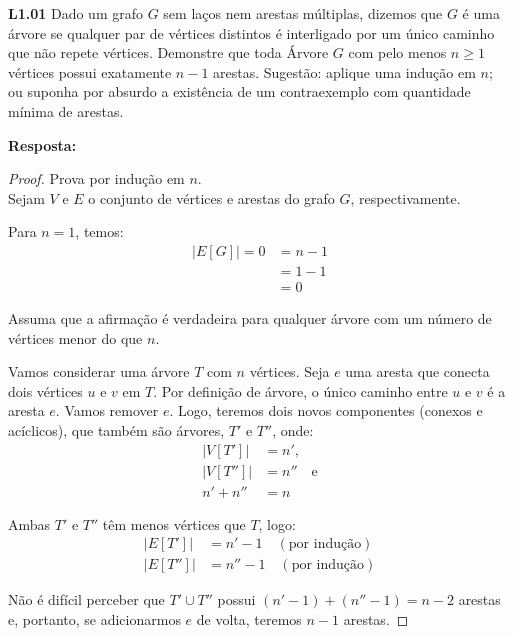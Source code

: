 
\noindent \textbf{L1.01} Dado um grafo $G$ sem laços nem arestas múltiplas, dizemos que $G$ é uma árvore se qualquer par de vértices distintos é interligado por um único caminho que não repete vértices. Demonstre que toda Árvore $G$ com pelo menos $n \geq 1$ vértices possui exatamente $n - 1$ arestas. Sugestão: aplique uma indução em $n$; ou suponha por absurdo a existência de um contraexemplo com quantidade mínima de arestas.

\textbf{Resposta:}
\begin{proof}
Prova por indução em $n$.\\

Sejam $V$ e $E$ o conjunto de vértices e arestas do grafo $G$, respectivamente.

\indbase Para $n = 1$, temos:
\begin{align*}
|E[G]| = 0 &= n - 1 \\
      &= 1 - 1 \\
      &= 0
\end{align*}

\indhypo Assuma que a afirmação é verdadeira para qualquer árvore com um número de vértices menor do que $n$.

\indstep Vamos considerar uma árvore $T$ com $n$ vértices. Seja $e$ uma aresta que conecta dois vértices $u$ e $v$ em $T$. Por definição de árvore, o único caminho entre $u$ e $v$ é a aresta $e$. Vamos remover $e$. Logo, teremos dois novos componentes (conexos e acíclicos), que também são árvores, $T'$ e $T''$, onde:
\begin{align*}
|V[T']|  &= n'  \text{,}\\
|V[T'']| &= n'' \quad \text{e} \\
n' + n'' &= n
\end{align*}

Ambas $T'$ e $T''$ têm menos vértices que $T$, logo:
\begin{align*}
|E[T']|  &= n' - 1   \quad (\text{por indução}) \\
|E[T'']| &= n'' - 1 \quad (\text{por indução})
\end{align*}

Não é difícil perceber que $T' \cup T''$ possui $(n' - 1) + (n'' - 1) = n -2$ arestas e, portanto, se adicionarmos $e$ de volta, teremos $n - 1$ arestas.

\end{proof}